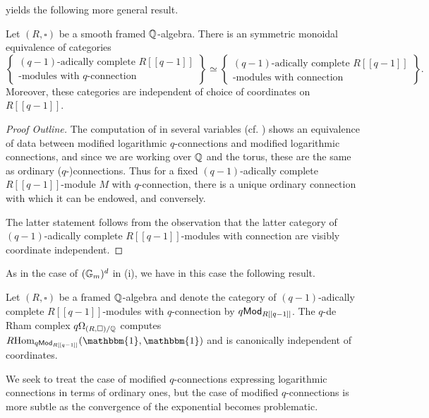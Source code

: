  yields the following more general result. 
\begin{proposition}\label{prop: R-modules with ordinary connection}
    Let $(R,\square)$ be a smooth framed $\mathbb{Q}$-algebra. There is an symmetric monoidal equivalence of categories 
    $$\left\{\substack{(q-1)\text{-adically complete }R[[q-1]] \\ \text{-modules with }q\text{-connection}}\right\}\simeq\left\{\substack{(q-1)\text{-adically complete }R[[q-1]] \\ \text{-modules with connection}}\right\}.$$
    Moreover, these categories are independent of choice of coordinates on $R[[q-1]]$. 
\end{proposition}
\begin{proof}[Proof Outline]
    The computation of  in several variables (cf. \cite[Lem. 4.1]{qDeformations}) shows an equivalence of data between modified logarithmic $q$-connections and modified logarithmic connections, and since we are working over $\mathbb{Q}$ and the torus, these are the same as ordinary ($q$-)connections. Thus for a fixed $(q-1)$-adically complete $R[[q-1]]$-module $M$ with $q$-connection, there is a unique ordinary connection with which it can be endowed, and conversely.
    
    The latter statement follows from the observation that the latter category of $(q-1)$-adically complete $R[[q-1]]$-modules with connection are visibly coordinate independent. 
\end{proof}
As in the case of $(\mathbb{G}_{m})^{d}$ in  (i), we have in this case the following result. 
\begin{corollary}\label{corr: modules with q-connection are coordinate independent}
    Let $(R,\square)$ be a framed $\mathbb{Q}$-algebra and denote the category of $(q-1)$-adically complete $R[[q-1]]$-modules with $q$-connection by $q\mathsf{Mod}_{R[[q-1]]}$. The $q$-de Rham complex $q\Omega_{(R,\square)/\mathbb{Q}}$ computes $R\Hom_{q\Mod_{R[[q-1]]}}(\mathbbm{1},\mathbbm{1})$ and is canonically independent of coordinates. 
\end{corollary}
We seek to treat the case of modified $q$-connections expressing logarithmic connections in terms of ordinary ones, but the case of modified $q$-connections is more subtle as the convergence of the exponential becomes problematic. 

